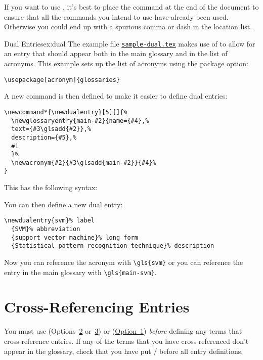 \documentclass[report,inlinetitle]{nlctdoc}
\newcommand*{\opt}[1]{\hyperlink{option#1}{Option~#1}}
\newcommand*{\optsor}[2]{Options~\hyperlink{option#1}{#1}
or~\hyperlink{option#2}{#2}}
\newcounter{sample}
\newcommand*{\samplefile}[2][sample]{%
  \hyperref[ex:#1#2]{\texttt{#1#2.tex}}}
\begin{document}
If you want to use , it's best to place the
command at the end of the document to ensure that all the commands
you intend to use have already been used. Otherwise you could end up
with a spurious comma or dash in the location list.

\begin{example}{Dual Entries}{ex:dual}
The example file \samplefile{-dual} makes use of  to
allow for an entry that should appear both in the main glossary and
in the list of acronyms. This example sets up the list of acronyms
using the  package option:
\begin{verbatim}
\usepackage[acronym]{glossaries}
\end{verbatim}
A new command is then defined to make it easier to define dual
entries:
\begin{verbatim}
\newcommand*{\newdualentry}[5][]{%
  \newglossaryentry{main-#2}{name={#4},%
  text={#3\glsadd{#2}},%
  description={#5},%
  #1
  }%
  \newacronym{#2}{#3\glsadd{main-#2}}{#4}%
}
\end{verbatim}
This has the following syntax:
\begin{alltt}
\end{alltt}
You can then define a new dual entry:
\begin{verbatim}
\newdualentry{svm}% label
  {SVM}% abbreviation
  {support vector machine}% long form
  {Statistical pattern recognition technique}% description
\end{verbatim}
Now you can reference the acronym with \verb|\gls{svm}| or you can
reference the entry in the main glossary with \verb|\gls{main-svm}|.
\end{example}

\chapter{Cross-Referencing Entries}
\label{sec:crossref}

\begin{important}
You must use  (\optsor23) or
 (\opt1) \emph{before} defining any
terms that cross-reference entries. If any of the terms that you have
cross-referenced don't appear in the glossary, check that you have
put \slash{} before all 
entry definitions.
\end{important}
\end{document}
